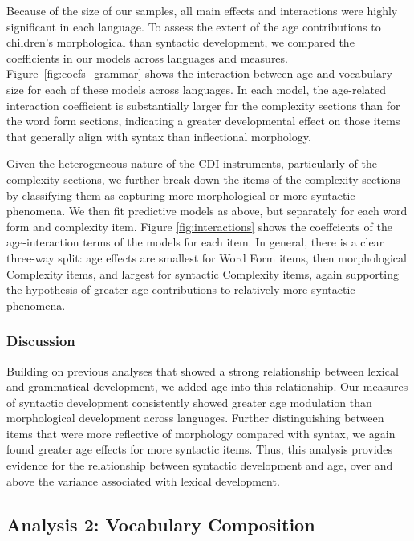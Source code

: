 \documentclass[10pt,letterpaper]{article}
\begin{document}
Because of the size of our samples, all main effects and interactions were highly significant in each language. To assess the extent of the age contributions to children's morphological than syntactic development, we compared the coefficients in our models across languages and measures. Figure~\ref{fig:coefs_grammar} shows the interaction between age and vocabulary size for each of these models across languages. In each model, the age-related interaction coefficient is substantially larger for the complexity sections than for the word form sections, indicating a greater developmental effect on those items that generally align with syntax than inflectional morphology.  

Given the heterogeneous nature of the CDI instruments, particularly of the complexity sections, we further break down the items of the complexity sections by classifying them as capturing more morphological or more syntactic phenomena. We then fit predictive models as above, but separately for each word form and complexity item. Figure \ref{fig:interactions} shows the coeffcients of the age-interaction terms of the models for each item. In general, there is a clear three-way split: age effects are smallest for Word Form items, then morphological Complexity items, and largest for syntactic Complexity items, again supporting the hypothesis of greater age-contributions to relatively more syntactic phenomena. 

\subsubsection{Discussion}

Building on previous analyses that showed a strong relationship between lexical and grammatical development, we added age into this relationship. Our measures of syntactic development consistently showed greater age modulation than morphological development across languages. Further distinguishing between items that were more reflective of morphology compared with syntax, we again found greater age effects for more syntactic items.  Thus, this analysis provides evidence for the relationship between syntactic development and age, over and above the variance associated with lexical development. 


\subsection{Analysis 2: Vocabulary Composition}
\end{document}
